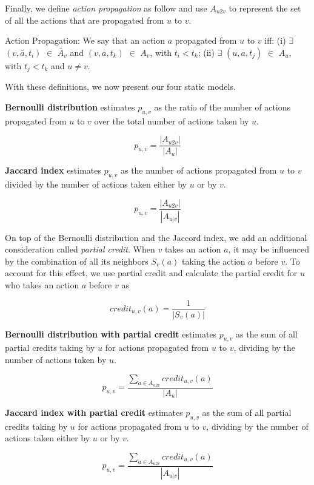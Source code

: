 Finally, we define {\em action propagation} as follow and use $A_{u2v}$ to represent the set of all the actions that are propagated from $u$ to $v$. 

\begin{definition}{Action Propagation:}
We say that an action $a$ propagated from $u$ to $v$ iff: (i) $\exists$ $(v, \bar{a}, t_i)$ $\in$ $\bar{A}_v$ 
and $(v, a, t_k)$ $\in$ $A_v$, with $t_i < t_k$; (ii) $\exists$ $(u, a, t_j)$ $\in$ $A_u$, with $t_j < t_k$ and $u \neq v$. 
\end{definition}

With these definitions, we now present our four static models.

{\bf Bernoulli distribution} estimates $p_{u,v}$ as the ratio of the number of actions 
propagated from $u$ to $v$ over the total number of actions taken by $u$.

$$p_{u,v} = \frac{|A_{u2v}|}{|A_u|}$$ 

{\bf Jaccard index} estimates 
$p_{u,v}$ as the number of actions propagated from $u$ to $v$ divided by 
the number of actions taken either by $u$ or by $v$.

$$p_{u,v} = \frac{|A_{u2v}|}{|A_{u|v}|}$$ 

On top of the Bernoulli distribution and the Jaccord index,
we add an additional consideration called {\em partial credit}.
When $v$ takes an action $a$, it may be influenced by the combination of all its neighbors $S_v(a)$ 
taking the action $a$ before $v$. %
To account for this effect, we use partial credit 
and calculate the partial credit for $u$ who takes an action $a$ before $v$ as 

$$credit_{u,v}(a) = \frac{1}{|S_v(a)|}$$

{\bf Bernoulli distribution with partial credit} 
estimates $p_{u,v}$ as the sum of all partial credits taking by $u$ for actions propagated from $u$ to $v$, 
dividing by the number of actions taken by $u$. 

$$p_{u,v} = \frac{\sum\limits_{a \in A_{u2v}}{credit_{u,v}(a)}}{|A_u|}$$

{\bf Jaccard index with partial credit} 
estimates $p_{u,v}$ as the sum of all partial credits taking by $u$ for actions propagated from $u$ to $v$, 
dividing by the number of actions taken either by $u$ or by $v$. 

$$p_{u,v} = \frac{\sum\limits_{a \in A_{u2v}}{credit_{u,v}(a)}}{|A_{u|v}|}$$




